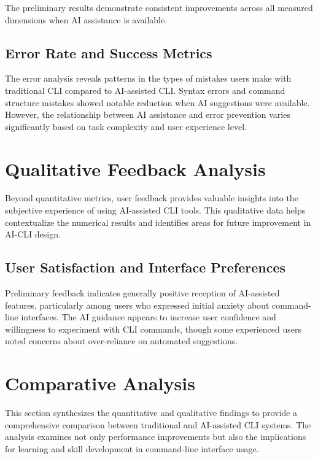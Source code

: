 The preliminary results demonstrate consistent improvements across all measured dimensions when AI assistance is available.

\subsection{Error Rate and Success Metrics}

The error analysis reveals patterns in the types of mistakes users make with traditional CLI compared to AI-assisted CLI. Syntax errors and command structure mistakes showed notable reduction when AI suggestions were available. However, the relationship between AI assistance and error prevention varies significantly based on task complexity and user experience level.

\section{Qualitative Feedback Analysis}

Beyond quantitative metrics, user feedback provides valuable insights into the subjective experience of using AI-assisted CLI tools. This qualitative data helps contextualize the numerical results and identifies areas for future improvement in AI-CLI design.

\subsection{User Satisfaction and Interface Preferences}

Preliminary feedback indicates generally positive reception of AI-assisted features, particularly among users who expressed initial anxiety about command-line interfaces. The AI guidance appears to increase user confidence and willingness to experiment with CLI commands, though some experienced users noted concerns about over-reliance on automated suggestions.

\section{Comparative Analysis}

This section synthesizes the quantitative and qualitative findings to provide a comprehensive comparison between traditional and AI-assisted CLI systems. The analysis examines not only performance improvements but also the implications for learning and skill development in command-line interface usage.

